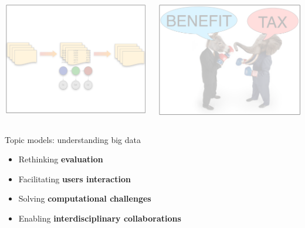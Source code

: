 \documentclass[compress]{beamer}
\begin{document}
\begin{frame}
  \begin{columns}
    \begin{center}
      \includegraphics[width=.85\linewidth]{cognitive/algorithms_off}
      \end{center}
    \begin{center}
      \includegraphics[width=.85\linewidth]{cognitive/framing_off}
      \end{center}
  \end{columns}

  \vspace{-5cm}

        \begin{block}{Topic models: understanding big data}

           \begin{itemize}
              \item Rethinking {\bf evaluation}
                \item Facilitating {\bf users interaction}
                  \item Solving {\bf computational challenges}
                    \item Enabling {\bf interdisciplinary collaborations}
            \end{itemize}

        \end{block}

\end{frame}
\end{document}
